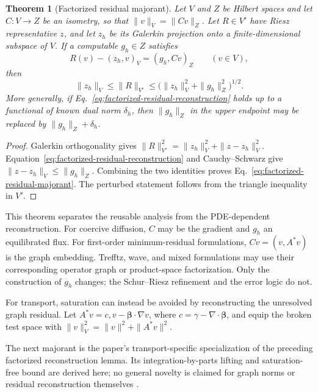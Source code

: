\documentclass[11pt]{article}
\newtheorem{theorem}{Theorem}[section]
\numberwithin{algorithm}{section}
\theoremstyle{definition}\newtheorem{definition}[theorem]{Definition}
\theoremstyle{remark}\newtheorem{remark}[theorem]{Remark}
\begin{document}
\begin{theorem}[Factorized residual majorant]
\label{thm:factorized-residual-majorant}
Let $V$ and $Z$ be Hilbert spaces and let $C:V\to Z$ be an isometry, so that
$\|v\|_V=\|Cv\|_Z$.  Let $R\in V'$ have Riesz representative $z$, and let
$z_h$ be its Galerkin projection onto a finite-dimensional subspace of $V$.
If a computable $g_h\in Z$ satisfies
\begin{equation}
 R(v)-(z_h,v)_V=(g_h,Cv)_Z\qquad(v\in V),
 \label{eq:factorized-residual-reconstruction}
\end{equation}
then
\begin{equation}
 \|z_h\|_V\leq\|R\|_{V'}
 \leq\bigl(\|z_h\|_V^2+\|g_h\|_Z^2\bigr)^{1/2}.
 \label{eq:factorized-residual-majorant}
\end{equation}
More generally, if Eq.~\eqref{eq:factorized-residual-reconstruction} holds
up to a functional of known dual norm $\delta_h$, then $\|g_h\|_Z$ in the
upper endpoint may be replaced by $\|g_h\|_Z+\delta_h$.
\end{theorem}

\begin{proof}
Galerkin orthogonality gives
$\|R\|_{V'}^2=\|z_h\|_V^2+\|z-z_h\|_V^2$.
Equation~\eqref{eq:factorized-residual-reconstruction} and Cauchy--Schwarz
give $\|z-z_h\|_V\leq\|g_h\|_Z$.  Combining the two identities proves
Eq.~\eqref{eq:factorized-residual-majorant}.  The perturbed statement follows
from the triangle inequality in $V'$.
\end{proof}

This theorem separates the reusable analysis from the PDE-dependent
reconstruction.  For coercive diffusion, $C$ may be the gradient and $g_h$ an
equilibrated flux.  For first-order minimum-residual formulations,
$Cv=(v,A^*v)$ is the graph embedding.  Trefftz, wave, and mixed formulations
may use their corresponding operator graph or product-space factorization.
Only the construction of $g_h$ changes; the Schur--Riesz refinement and the
error logic do not.

\secondarytheoryC
For transport, saturation can instead be avoided by reconstructing the
unresolved graph residual.  Let
$A^*v=c,v-\boldsymbol\beta\cdot\nabla v$, where
$c=\gamma-\nabla\cdot\boldsymbol\beta$, and equip the broken test space with
$\|v\|_V^2=\|v\|^2+\|A^*v\|^2$.

The next majorant is the paper's transport-specific specialization of the
preceding factorized reconstruction lemma.  Its integration-by-parts lifting
and saturation-free bound are derived here; no general novelty is claimed for
graph norms or residual reconstruction themselves
\cite{demkowiczgopalakrishnan2011}.
\end{document}
